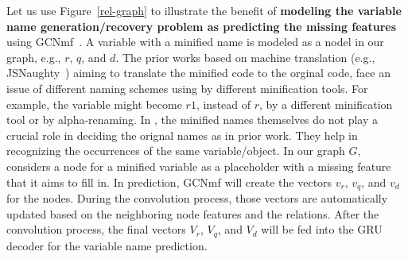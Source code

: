 Let us use Figure~\ref{rel-graph} to illustrate the benefit of {\bf
modeling the variable name generation/recovery problem as predicting
the missing features} using GCNmf~\cite{GCNmf}. A variable with a
minified name is modeled as a nodel in our graph, e.g., $r$, $q$, and
$d$.  The prior works based on machine translation (e.g.,
JSNaughty~\cite{JSNaughty2017}) aiming to translate the minified code
to the orginal code, face an issue of different naming schemes using
by different minification tools. For example, the
variable  might become $r1$, instead of $r$, by a
different minification tool or by alpha-renaming. In {\tool}, the
minified names themselves do not play a crucial role in deciding the
orignal names as in prior work. They help in recognizing the
occurrences of the same variable/object.  In our graph $G$, {\tool}
considers a node for a minified variable as a placeholder with a
missing feature that it aims to fill in.  In prediction, GCNmf will
create the vectors $v_r$, $v_q$, and $v_d$ for the nodes. During the
convolution process, those vectors are automatically updated based on
the neighboring node features and the relations. After the convolution
process, the final vectors $V_r$, $V_q$, and $V_d$ will be fed into
the GRU decoder for the variable name prediction.


